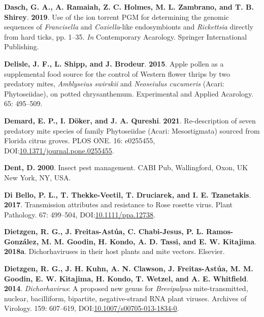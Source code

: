\documentclass[12pt,final,CPage]{ufthesis}
\newlength{\cslhangindent}
\newenvironment{CSLReferences}[2] %
{%
	\setlength{\parindent}{0pt}
	\ifodd #1 \everypar{\setlength{\hangindent}{\cslhangindent}}\ignorespaces\fi
	\ifnum #2 > 0
	\setlength{\parskip}{#2\baselineskip}
	\fi
}%
{}
\begin{document}
{\begin{CSLReferences}{1}{0}
  \leavevmode{}%
  \textbf{Dasch, G. A., A. Ramaiah, Z. C. Holmes, M. L. Zambrano, and T. B. Shirey}. \textbf{2019}. Use of the ion torrent {PGM} for determining the genomic sequences of {\emph{Francisella}} and {\emph{Coxiella}}-like endosymbionts and {\emph{Rickettsia}} directly from hard ticks, pp. 1--35. \emph{In} Contemporary Acarology. Springer International Publishing.

  \leavevmode{}%
  \textbf{Delisle, J. F., L. Shipp, and J. Brodeur}. \textbf{2015}. Apple pollen as a supplemental food source for the control of {Western flower thrips} by two predatory mites, {\emph{Amblyseius swirskii}} and {\emph{Neoseiulus cucumeris}} {({Acari}: {Phytoseiidae})}, on potted chrysanthemum. Experimental and Applied Acarology. 65: 495--509.

  \leavevmode{}%
  \textbf{Demard, E. P., I. Döker, and J. A. Qureshi}. \textbf{2021}. Re-description of seven predatory mite species of family {Phytoseiidae} ({Acari}: {Mesostigmata}) sourced from {Florida} citrus groves. {PLOS} {ONE}. 16: e0255455, DOI:\href{https://doi.org/10.1371/journal.pone.0255455}{10.1371/journal.pone.0255455}.

  \leavevmode{}%
  \textbf{Dent, D.} \textbf{2000}. Insect pest management. CABI Pub, Wallingford, Oxon, UK New York, NY, USA.

  \leavevmode{}%
  \textbf{Di Bello, P. L., T. Thekke-Veetil, T. Druciarek, and I. E. Tzanetakis}. \textbf{2017}. Transmission attributes and resistance to {Rose rosette virus}. Plant Pathology. 67: 499--504, DOI:\href{https://doi.org/10.1111/ppa.12738}{10.1111/ppa.12738}.

  \leavevmode{}%
  \textbf{Dietzgen, R. G., J. Freitas-Astúa, C. Chabi-Jesus, P. L. Ramos-González, M. M. Goodin, H. Kondo, A. D. Tassi, and E. W. Kitajima}. \textbf{2018a}. Dichorhaviruses in their host plants and mite vectors. Elsevier.

  \leavevmode{}%
  \textbf{Dietzgen, R. G., J. H. Kuhn, A. N. Clawson, J. Freitas-Astúa, M. M. Goodin, E. W. Kitajima, H. Kondo, T. Wetzel, and A. E. Whitfield}. \textbf{2014}. {\emph{Dichorhavirus}}: A proposed new genus for {\emph{Brevipalpus}} mite-transmitted, nuclear, bacilliform, bipartite, negative-strand {RNA} plant viruses. Archives of Virology. 159: 607--619, DOI:\href{https://doi.org/10.1007/s00705-013-1834-0}{10.1007/s00705-013-1834-0}.


\end{CSLReferences}}
\end{document}
